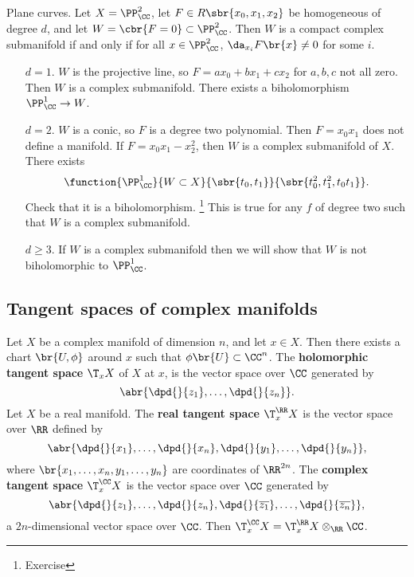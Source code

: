\begin{example}
Plane curves. Let $ X = \PP_\CC^2 $, let $ F \in R\sbr{x_0, x_1, x_2} $ be homogeneous of degree $ d $, and let $ W = \cbr{F = 0} \subset \PP_\CC^2 $. Then $ W $ is a compact complex submanifold if and only if for all $ x \in \PP_\CC^2 $, $ \da_{x_i} F\br{x} \ne 0 $ for some $ i $.
\begin{itemize}[leftmargin=0.5in]
\item[$ d = 1 $.] $ W $ is the projective line, so $ F = ax_0 + bx_1 + cx_2 $ for $ a, b, c $ not all zero. Then $ W $ is a complex submanifold. There exists a biholomorphism $ \PP_\CC^1 \to W $.
\item[$ d = 2 $.] $ W $ is a conic, so $ F $ is a degree two polynomial. Then $ F = x_0x_1 $ does not define a manifold. If $ F = x_0x_1 - x_2^2 $, then $ W $ is a complex submanifold of $ X $. There exists
$$ \function{\PP_\CC^1}{W \subset X}{\sbr{t_0, t_1}}{\sbr{t_0^2, t_1^2, t_0t_1}}. $$
Check that it is a biholomorphism. \footnote{Exercise} This is true for any $ f $ of degree two such that $ W $ is a complex submanifold.
\item[$ d \ge 3 $.] If $ W $ is a complex submanifold then we will show that $ W $ is not biholomorphic to $ \PP_\CC^1 $.
\end{itemize}
\end{example}

\subsection{Tangent spaces of complex manifolds}

\begin{definition}
Let $ X $ be a complex manifold of dimension $ n $, and let $ x \in X $. Then there exists a chart $ \br{U, \phi} $ around $ x $ such that $ \phi\br{U} \subset \CC^n $. The \textbf{holomorphic tangent space} $ \T_xX $ of $ X $ at $ x $, is the vector space over $ \CC $ generated by
$$ \abr{\dpd{}{z_1}, \dots, \dpd{}{z_n}}. $$
Let $ X $ be a real manifold. The \textbf{real tangent space} $ \T_x^\RR X $ is the vector space over $ \RR $ defined by
$$ \abr{\dpd{}{x_1}, \dots, \dpd{}{x_n}, \dpd{}{y_1}, \dots, \dpd{}{y_n}}, $$
where $ \br{x_1, \dots, x_n, y_1, \dots, y_n} $ are coordinates of $ \RR^{2n} $. The \textbf{complex tangent space} $ \T_x^\CC X $ is the vector space over $ \CC $ generated by
$$ \abr{\dpd{}{z_1}, \dots, \dpd{}{z_n}, \dpd{}{\overline{z_1}}, \dots, \dpd{}{\overline{z_n}}}, $$
a $ 2n $-dimensional vector space over $ \CC $. Then $ \T_x^\CC X = \T_x^\RR X \otimes_\RR \CC $.
\end{definition}

